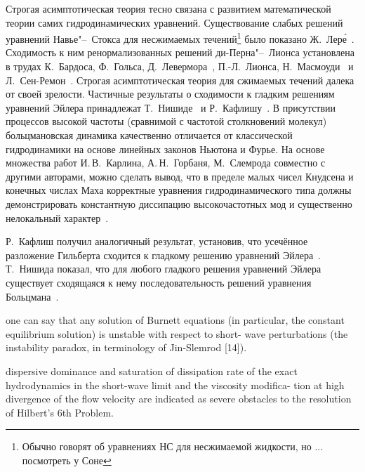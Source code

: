 Строгая асимптотическая теория тесно связана с развитием математической теории самих гидродинамических уравнений.
Существование слабых решений уравнений Навье"--~Стокса для несжимаемых течений\footnote{
Обычно говорят об уравнениях НС для несжимаемой жидкости, но ... посмотреть у Соне
} было показано Ж.~Лер\'{е}~\autocite{Leray1934}.
Сходимость к ним ренормализованных решений ди-Перна"--~Лионса установлена в трудах
К.~Бардоса, Ф.~Гольса, Д.~Левермора~\autocite{Bardos1993},
П.-Л.~Лионса, Н.~Масмоуди~\autocite{Masmoudi2001} и Л.~Сен-Ремон~\autocite{Golse2004}.
Строгая асимптотическая теория для сжимаемых течений далека от своей зрелости.
Частичные результаты о сходимости к гладким решениям уравнений Эйлера принадлежат
Т.~Нишиде~\autocite{Nishida1978} и Р.~Кафлишу~\autocite{Caflisch1980limit}.
В присутствии процессов высокой частоты (сравнимой с частотой столкновений молекул) больцмановская динамика
качественно отличается от классической гидродинамики на основе линейных законов Ньютона и Фурье.
На основе множества работ И.\,В.~Карлина, А.\,Н.~Горбаня, М.~Слемрода совместно с другими авторами,
можно сделать вывод, что в пределе малых чисел Кнудсена и конечных числах Маха корректные уравнения
гидродинамического типа должны демонстрировать константную диссипацию высокочастотных мод
и существенно нелокальный характер~\autocite{Gorban2014}.



Р.~Кафлиш получил аналогичный результат, установив, что усечённое разложение Гильберта
сходится к гладкому решению уравнений Эйлера~\cite{Caflisch1980limit}.
Т.~Нишида показал, что для любого гладкого решения уравнений Эйлера существует сходящаяся к нему
последовательность решений уравнения Больцмана~\cite{Nishida1978}.



one can say that any solution of Burnett equations (in particular, the constant equilibrium solution) is unstable with respect to short- wave perturbations (the instability paradox, in terminology of Jin-Slemrod [14]).

dispersive dominance and saturation of dissipation rate of the exact hydrodynamics in the short-wave limit and the viscosity modifica- tion at high divergence of the flow velocity are indicated as severe obstacles to the resolution of Hilbert’s 6th Problem.

